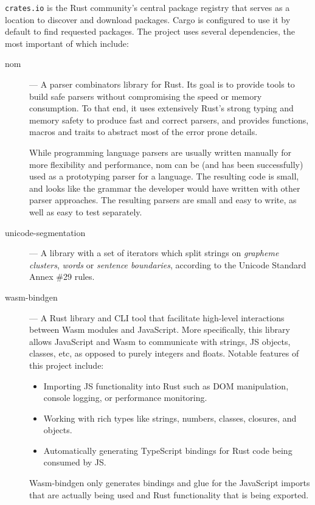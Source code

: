 \documentclass[english,bachelors,forcepolishlogotype]{wizthesis}
\newcommand{\paraphrase}[1]{#1}
\begin{document}
\texttt{crates.io} \paraphrase{is the Rust community's central package registry
that serves as a location to discover and download packages. Cargo is configured
to use it by default to find requested packages.} The project uses several
dependencies, the most important of which include:
\begin{description}
  \item[nom] \cite{nom,couprie-2015} --- \paraphrase{A parser combinators
  library for Rust. Its goal is to provide tools to build safe parsers without
  compromising the speed or memory consumption. To that end, it uses extensively
  Rust's strong typing and memory safety to produce fast and correct parsers,
  and provides functions, macros and traits to abstract most of the error prone
  details.

  While programming language parsers are usually written manually for more
  flexibility and performance, nom can be (and has been successfully) used as a
  prototyping parser for a language. The resulting code is small, and looks like
  the grammar the developer would have written with other parser approaches. The
  resulting parsers are small and easy to write, as well as easy to test
  separately.}
  \item[unicode-segmentation] \cite{unicode-segmentation} --- A library with a
  set of iterators which split strings on \emph{grapheme clusters}, \emph{words}
  or \emph{sentence boundaries}, according to the Unicode Standard Annex \#29
  \cite{unicode-standard-annex-29} rules.
  \item[wasm-bindgen] \cite{wasm-bindgen} --- \paraphrase{A Rust library and CLI
  tool that facilitate high-level interactions between Wasm modules and
  JavaScript. More specifically, this library allows JavaScript and Wasm to
  communicate with strings, JS objects, classes, etc, as opposed to purely
  integers and floats. Notable features of this project include:
  \begin{itemize}
    \item Importing JS functionality into Rust such as DOM manipulation, console
    logging, or performance monitoring.
    \item Working with rich types like strings, numbers, classes, closures, and
    objects.
    \item Automatically generating TypeScript bindings for Rust code being
    consumed by JS.
  \end{itemize}
  Wasm-bindgen only generates bindings and glue for the JavaScript imports that
  are actually being used and Rust functionality that is being exported.}

\end{description}
\end{document}
